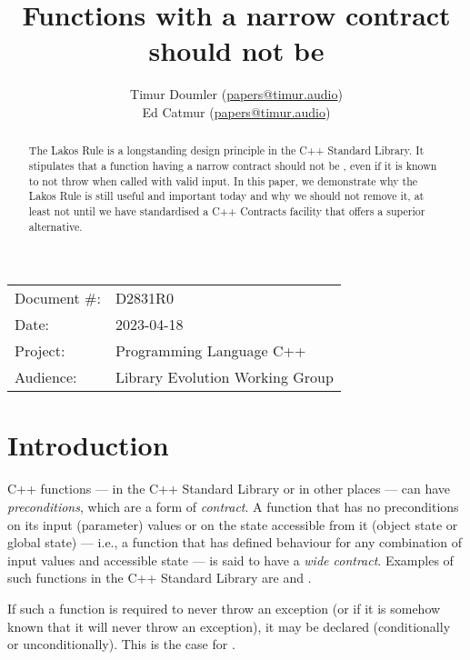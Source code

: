 


\title{Functions with a narrow contract should not be }
\author{ Timur Doumler \small(\href{mailto:papers@timur.audio}{papers@timur.audio})   \\
Ed Catmur \small(\href{mailto:papers@timur.audio}{papers@timur.audio})  }
\date{}
\maketitle

\begin{tabular}{ll}
Document \#: & D2831R0 \\
Date: &2023-04-18 \\
Project: & Programming Language C++ \\
Audience: & Library Evolution Working Group
\end{tabular}

\begin{abstract}
The Lakos Rule is a longstanding design principle in the C++ Standard Library. It stipulates that a function having a narrow contract should not be , even if it is known to not throw when called with valid input. In this paper, we demonstrate why the Lakos Rule is still useful and important today and why we should not remove it, at least not until we have standardised a C++ Contracts facility that offers a superior alternative.
\end{abstract}

\section{Introduction}
\label{sec:intro}

C++ functions --- in the C++ Standard Library or in other places --- can have \emph{preconditions}, which are a form of \emph{contract}. A function that has no preconditions on its input (parameter) values or on the state accessible from it (object state or global state) --- i.e., a function that has defined behaviour for any combination of input values and accessible state --- is said to have a \emph{wide contract}. Examples of such functions in the C++ Standard Library are  and .

If such a function is required to never throw an exception (or if it is somehow known that it will never throw an exception), it may be declared  (conditionally or unconditionally). This is the case for .

